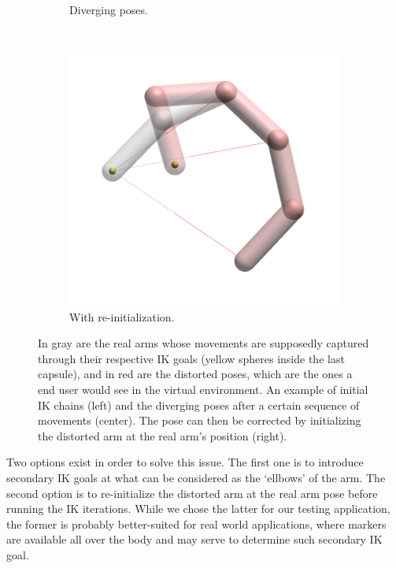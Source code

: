 \begin{figure}[h]
\begin{subfigure}[b]{0.3\textwidth}
        \caption{Diverging poses.}
        \label{subfig:divergence}
    \end{subfigure}
    ~
    \begin{subfigure}[b]{0.28\textwidth}
        \includegraphics[width=\textwidth]{Figures/arm_initDivergence.png}
        \caption{With re-initialization.}
        \label{subfig:initDivergence}
    \end{subfigure}
    \caption{In gray are the real arms whose movements are supposedly captured through their respective IK goals (yellow spheres inside the last capsule), and in red are the distorted poses, which are the ones a end user would see in the virtual environment. An example of initial IK chains (left) and the diverging poses after a certain sequence of movements (center). The pose can then be corrected by initializing the distorted arm at the real arm's position (right).}
    \label{fig:divergence}
\end{figure}

Two options exist in order to solve this issue. The first one is to introduce secondary IK goals at what can be considered as the `ellbows' of the arm. The second option is to re-initialize the distorted arm at the real arm pose before running the IK iterations. While we chose the latter for our testing application, the former is probably better-suited for real world applications, where markers are available all over the body and may serve to determine such secondary IK goal.